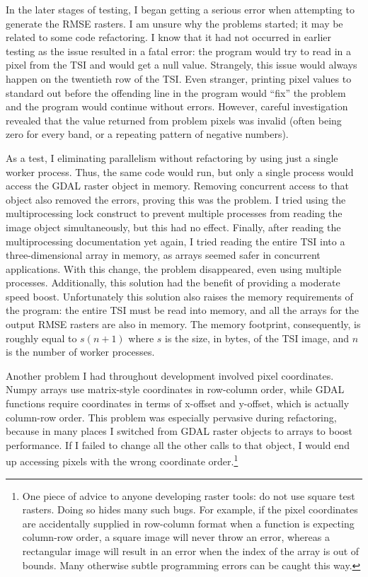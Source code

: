 In the later stages of testing, I began getting a serious error when attempting to generate the RMSE rasters. I am unsure why the problems started; it may be related to some code refactoring. I know that it had not occurred in earlier testing as the issue resulted in a fatal error: the program would try to read in a pixel from the TSI and would get a null value. Strangely, this issue would always happen on the twentieth row of the TSI. Even stranger, printing pixel values to standard out before the offending line in the program would ``fix'' the problem and the program would continue without errors. However, careful investigation revealed that the value returned from problem pixels was invalid (often being zero for every band, or a repeating pattern of negative numbers).

As a test, I eliminating parallelism without refactoring by using just a single worker process. Thus, the same code would run, but only a single process would access the GDAL raster object in memory. Removing  concurrent access to that object also removed the errors, proving this was the problem. I tried using the multiprocessing lock construct to prevent multiple processes from reading the image object simultaneously, but this had no effect. Finally, after reading the multiprocessing documentation yet again, I tried reading the entire TSI into a three-dimensional array in memory, as arrays seemed safer in concurrent applications. With this change, the problem disappeared, even using multiple processes. Additionally, this solution had the benefit of providing a moderate speed boost. Unfortunately this solution also raises the memory requirements of the program: the entire TSI must be read into memory, and all the arrays for the output RMSE rasters are also in memory. The memory footprint, consequently, is roughly equal to $s(n + 1)$ where $s$ is the size, in bytes, of the TSI image, and $n$ is the number of worker processes.

Another problem I had throughout development involved pixel coordinates. Numpy arrays use matrix-style coordinates in row-column order, while GDAL functions require coordinates in terms of x-offset and y-offset, which is actually column-row order. This problem was especially pervasive during refactoring, because in many places I switched from GDAL raster objects to arrays to boost performance. If I failed to change all the other calls to that object, I would end up accessing pixels with the wrong coordinate order.\footnote{One piece of advice to anyone developing raster tools: do not use square test rasters. Doing so hides many such bugs. For example, if the pixel coordinates are accidentally supplied in row-column format when a function is expecting column-row order, a square image will never throw an error, whereas a rectangular image will result in an error when the index of the array is out of bounds. Many otherwise subtle programming errors can be caught this way.}

